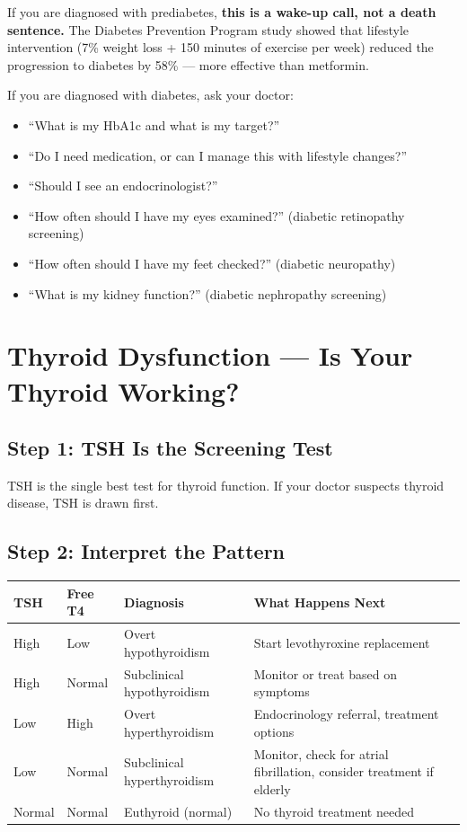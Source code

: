 If you are diagnosed with prediabetes, \textbf{this is a wake-up call, not a death sentence.} The Diabetes Prevention Program study showed that lifestyle intervention (7\% weight loss + 150 minutes of exercise per week) reduced the progression to diabetes by 58\% --- more effective than metformin.

If you are diagnosed with diabetes, ask your doctor:
\begin{itemize}
    \item ``What is my HbA1c and what is my target?''
    \item ``Do I need medication, or can I manage this with lifestyle changes?''
    \item ``Should I see an endocrinologist?''
    \item ``How often should I have my eyes examined?'' (diabetic retinopathy screening)
    \item ``How often should I have my feet checked?'' (diabetic neuropathy)
    \item ``What is my kidney function?'' (diabetic nephropathy screening)
\end{itemize}

\clearpage
\section{Thyroid Dysfunction --- Is Your Thyroid Working?}

\subsection{Step 1: TSH Is the Screening Test}

TSH is the single best test for thyroid function. If your doctor suspects thyroid disease, TSH is drawn first.

\subsection{Step 2: Interpret the Pattern}

\begin{longtable}{@{}llll@{}}
\toprule
\textbf{TSH} & \textbf{Free T4} & \textbf{Diagnosis} & \textbf{What Happens Next} \\
\midrule
High & Low & Overt hypothyroidism & Start levothyroxine replacement \\
High & Normal & Subclinical hypothyroidism & Monitor or treat based on symptoms \\
Low & High & Overt hyperthyroidism & Endocrinology referral, treatment options \\
Low & Normal & Subclinical hyperthyroidism & Monitor, check for atrial fibrillation, consider treatment if elderly \\
Normal & Normal & Euthyroid (normal) & No thyroid treatment needed \\
\bottomrule
\end{longtable}

